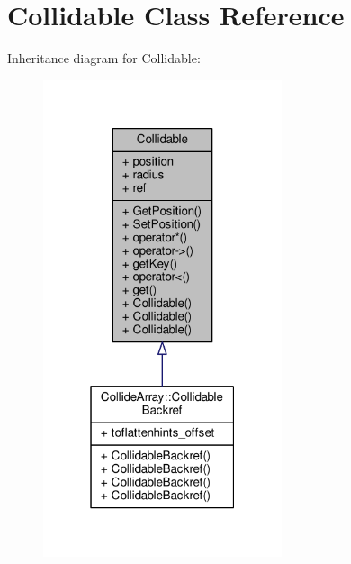\hypertarget{classCollidable}{}\section{Collidable Class Reference}
\label{classCollidable}


Inheritance diagram for Collidable\+:
\nopagebreak
\begin{figure}[H]
\begin{center}
\leavevmode
\includegraphics[width=199pt]{d0/df1/classCollidable__inherit__graph}
\end{center}
\end{figure}



